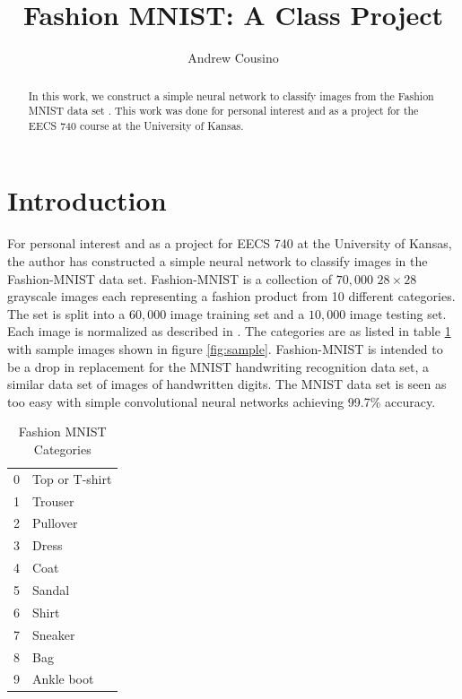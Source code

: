 \documentclass{IEEEtran}
\title{Fashion MNIST: A Class Project}
\author{Andrew Cousino}
\begin{document}
\lstset{language=Python,frame=lines}
\maketitle

\begin{abstract}
In this work, we construct a simple neural network to classify images from the
Fashion MNIST data set \cite{xiao2017fashionmnist}. This work was done for
personal interest and as a project for the EECS 740 course at the University
of Kansas.
\end{abstract}

\section{Introduction}
For personal interest and as a project for EECS 740 at the University of Kansas,
the author has constructed a simple neural network to classify images in the
Fashion-MNIST data set. Fashion-MNIST \cite{xiao2017fashionmnist} is a
collection of \(70,000\) \(28\times 28\) grayscale images each representing a
fashion product from 10 different categories. The set is split into a \(60,000\)
image training set and a \(10,000\) image testing set. Each image is normalized
as described in \cite{xiao2017fashionmnist}. The categories are as listed in
table \ref{table:categories} with sample images shown in figure
\ref{fig:sample}. Fashion-MNIST is intended to be a drop in replacement for the
MNIST handwriting recognition data set, a similar data set of images of
handwritten digits. The MNIST data set is seen as too easy with simple
convolutional neural networks achieving 99.7\% accuracy.

\begin{table}[h]
    \centering
    \begin{tabular}{rl}
        0 & Top or T-shirt \\
        1 & Trouser \\
        2 & Pullover \\
        3 & Dress \\
        4 & Coat \\
        5 & Sandal \\
        6 & Shirt \\
        7 & Sneaker \\
        8 & Bag \\
        9 & Ankle boot \\
    \end{tabular}
    \caption{Fashion MNIST Categories}
    \label{table:categories}
\end{table}
\end{document}

